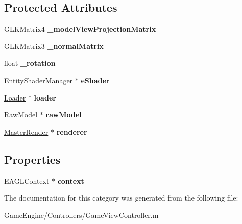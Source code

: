 \subsection*{Protected Attributes}
\begin{DoxyCompactItemize}
\item 
G\+L\+K\+Matrix4 {\bfseries \+\_\+model\+View\+Projection\+Matrix}\hypertarget{category_game_view_controller_07_08_afc4fc1314206c1e92d45a8ec848c0b3b}{}\label{category_game_view_controller_07_08_afc4fc1314206c1e92d45a8ec848c0b3b}

\item 
G\+L\+K\+Matrix3 {\bfseries \+\_\+normal\+Matrix}\hypertarget{category_game_view_controller_07_08_a87988e8a48e8173b6ea83ffb39183e05}{}\label{category_game_view_controller_07_08_a87988e8a48e8173b6ea83ffb39183e05}

\item 
float {\bfseries \+\_\+rotation}\hypertarget{category_game_view_controller_07_08_aace8109299beb90fbd3d5239fc8bb604}{}\label{category_game_view_controller_07_08_aace8109299beb90fbd3d5239fc8bb604}

\item 
\hyperlink{interface_entity_shader_manager}{Entity\+Shader\+Manager} $\ast$ {\bfseries e\+Shader}\hypertarget{category_game_view_controller_07_08_aa65130f2cf26c4572910ccc0c5334007}{}\label{category_game_view_controller_07_08_aa65130f2cf26c4572910ccc0c5334007}

\item 
\hyperlink{interface_loader}{Loader} $\ast$ {\bfseries loader}\hypertarget{category_game_view_controller_07_08_a39ed19c46c0425a8804f79e770dd6468}{}\label{category_game_view_controller_07_08_a39ed19c46c0425a8804f79e770dd6468}

\item 
\hyperlink{interface_raw_model}{Raw\+Model} $\ast$ {\bfseries raw\+Model}\hypertarget{category_game_view_controller_07_08_aeded52f4f281027ac274883b781345c5}{}\label{category_game_view_controller_07_08_aeded52f4f281027ac274883b781345c5}

\item 
\hyperlink{interface_master_render}{Master\+Render} $\ast$ {\bfseries renderer}\hypertarget{category_game_view_controller_07_08_aaa575ada3569e8d87dc915fcf9df12a7}{}\label{category_game_view_controller_07_08_aaa575ada3569e8d87dc915fcf9df12a7}

\end{DoxyCompactItemize}
\subsection*{Properties}
\begin{DoxyCompactItemize}
\item 
E\+A\+G\+L\+Context $\ast$ {\bfseries context}\hypertarget{category_game_view_controller_07_08_a0faae9bb6914ccd71c8550177f95d41c}{}\label{category_game_view_controller_07_08_a0faae9bb6914ccd71c8550177f95d41c}

\end{DoxyCompactItemize}


The documentation for this category was generated from the following file\+:\begin{DoxyCompactItemize}
\item 
Game\+Engine/\+Controllers/Game\+View\+Controller.\+m\end{DoxyCompactItemize}
